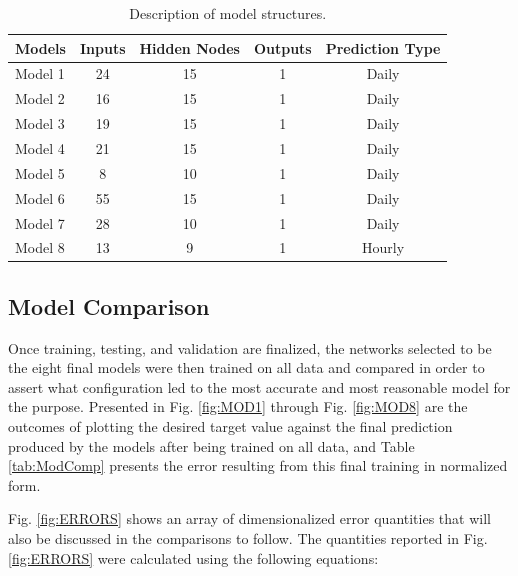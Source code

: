 \documentclass[
10pt, %
letterpaper, %
twoside, %
headinclude,footinclude, %
BCOR5mm, %
]{scrartcl}
\begin{document}
\begin{table}[h!]
	\centering
	\caption{Description of model structures.}
	\begin{tabular}{|l|c|c|c|c|}
		\hline
		\textbf{Models} & \textbf{Inputs} & \textbf{Hidden Nodes} & \textbf{Outputs} & \textbf{Prediction Type}\\\hline
		Model 1 & 24 & 15 & 1 & Daily\\\hline
		Model 2 & 16 & 15 & 1 & Daily\\\hline
		Model 3 & 19 & 15 & 1 & Daily\\\hline
		Model 4 & 21 & 15 & 1 & Daily\\\hline
		Model 5 & 8 & 10 & 1 & Daily\\\hline
		Model 6 & 55 & 15 & 1 & Daily\\\hline
		Model 7 & 28 & 10 & 1 & Daily\\\hline
		Model 8 & 13 & 9 & 1 & Hourly\\\hline
	\end{tabular}
	\label{tab:ModStruct}
	
\end{table}


\subsection{Model Comparison} \label{sec:ComSel}

Once training, testing, and validation are finalized, the networks selected to be the eight final models were then trained on all data and compared in order to assert what configuration led to the most accurate and most reasonable model for the purpose. 
Presented in Fig. \ref{fig:MOD1} through Fig. \ref{fig:MOD8} are the outcomes of plotting the desired target value against the final prediction produced by the models after being trained on all data, and Table \ref{tab:ModComp} presents the error resulting from this final training in normalized form.

 Fig. \ref{fig:ERRORS} shows an array of dimensionalized error quantities that will also be discussed in the comparisons to follow. The quantities reported in Fig. \ref{fig:ERRORS} were calculated using the following equations:
\end{document}
